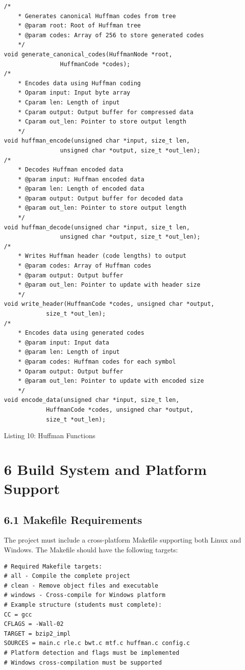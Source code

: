 \documentclass[10pt]{article}
\begin{document}
\begin{verbatim}
/*
    * Generates canonical Huffman codes from tree
    * @param root: Root of Huffman tree
    * @param codes: Array of 256 to store generated codes
    */
void generate_canonical_codes(HuffmanNode *root,
                HuffmanCode *codes);
/*
    * Encodes data using Huffman coding
    * Oparam input: Input byte array
    * Cparam len: Length of input
    * Cparam output: Output buffer for compressed data
    * Cparam out_len: Pointer to store output length
    */
void huffman_encode(unsigned char *input, size_t len,
                unsigned char *output, size_t *out_len);
/*
    * Decodes Huffman encoded data
    * @param input: Huffman encoded data
    * @param len: Length of encoded data
    * @param output: Output buffer for decoded data
    * @param out_len: Pointer to store output length
    */
void huffman_decode(unsigned char *input, size_t len,
                unsigned char *output, size_t *out_len);
/*
    * Writes Huffman header (code lengths) to output
    * @param codes: Array of Huffman codes
    * @param output: Output buffer
    * @param out_len: Pointer to update with header size
    */
void write_header(HuffmanCode *codes, unsigned char *output,
            size_t *out_len);
/*
    * Encodes data using generated codes
    * @param input: Input data
    * @param len: Length of input
    * @param codes: Huffman codes for each symbol
    * Oparam output: Output buffer
    * @param out_len: Pointer to update with encoded size
    */
void encode_data(unsigned char *input, size_t len,
            HuffmanCode *codes, unsigned char *output,
            size_t *out_len);
\end{verbatim}

Listing 10: Huffman Functions

\section*{6 Build System and Platform Support}
\subsection*{6.1 Makefile Requirements}
The project must include a cross-platform Makefile supporting both Linux and Windows. The Makefile should have the following targets:

\begin{verbatim}
# Required Makefile targets:
# all - Compile the complete project
# clean - Remove object files and executable
# windows - Cross-compile for Windows platform
# Example structure (students must complete):
CC = gcc
CFLAGS = -Wall-02
TARGET = bzip2_impl
SOURCES = main.c rle.c bwt.c mtf.c huffman.c config.c
# Platform detection and flags must be implemented
# Windows cross-compilation must be supported
\end{verbatim}
\end{document}
